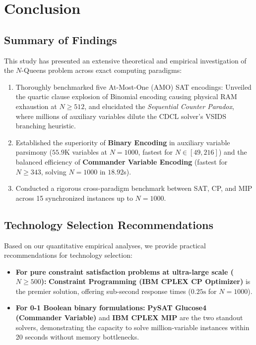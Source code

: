 \documentclass[a4paper,fleqn]{cas-sc}
\begin{document}
\section{Conclusion}
\label{sec:conclusion}

\subsection{Summary of Findings}
\label{subsec:conclusion_summary}
This study has presented an extensive theoretical and empirical investigation of the $N$-Queens problem across exact computing paradigms:
\begin{enumerate}
    \item Thoroughly benchmarked five At-Most-One (AMO) SAT encodings: Unveiled the quartic clause explosion of Binomial encoding causing physical RAM exhaustion at $N \ge 512$, and elucidated the \textit{Sequential Counter Paradox}, where millions of auxiliary variables dilute the CDCL solver's VSIDS branching heuristic.
    \item Established the superiority of \textbf{Binary Encoding} in auxiliary variable parsimony ($55.9\text{K}$ variables at $N=1000$, fastest for $N \in [49, 216]$) and the balanced efficiency of \textbf{Commander Variable Encoding} (fastest for $N \ge 343$, solving $N = 1000$ in $18.92$s).
    \item Conducted a rigorous cross-paradigm benchmark between SAT, CP, and MIP across 15 synchronized instances up to $N = 1000$.
\end{enumerate}

\subsection{Technology Selection Recommendations}
\label{subsec:recommendations}
Based on our quantitative empirical analyses, we provide practical recommendations for technology selection:
\begin{itemize}
    \item \textbf{For pure constraint satisfaction problems at ultra-large scale ($N \ge 500$):} \textbf{Constraint Programming (IBM CPLEX CP Optimizer)} is the premier solution, offering sub-second response times ($0.25\text{s}$ for $N = 1000$).
    \item \textbf{For 0-1 Boolean binary formulations:} \textbf{PySAT Glucose4 (Commander Variable)} and \textbf{IBM CPLEX MIP} are the two standout solvers, demonstrating the capacity to solve million-variable instances within 20 seconds without memory bottlenecks.
\end{itemize}
\end{document}
